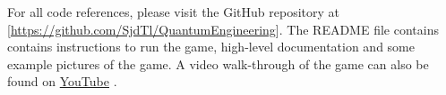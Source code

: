 \documentclass[final,5p,times,twocolumn,authoryear]{elsarticle}
\begin{document}

For all code references, please visit the GitHub repository at [\url{https://github.com/SjdTl/QuantumEngineering}]. The README file contains contains instructions to run the game, high-level documentation and some example pictures of the game.  A video walk-through of the game can also be found on \href{https://www.youtube.com/watch?v=1wOmJI2PlPA}{\color{red}YouTube} \cite{youtubewalkthrough}.





\printbibliography
\end{document}

